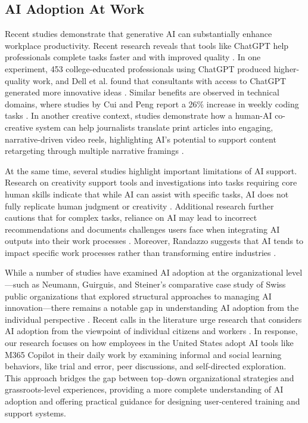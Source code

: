 
\subsection{AI Adoption At Work}
Recent studies demonstrate that generative AI can substantially enhance workplace productivity. Recent research reveals that tools like ChatGPT help professionals complete tasks faster and with improved quality \cite{brynjolfsson2024generativeaiwork}. In one experiment, 453 college-educated professionals using ChatGPT produced higher-quality work, and Dell et al. found that consultants with access to ChatGPT generated more innovative ideas \cite{dell2023navigating}. Similar benefits are observed in technical domains, where studies by Cui and Peng report a 26\% increase in weekly coding tasks \cite{cui2024effects, peng2023impact}. In another creative context, studies demonstrate how a human-AI co-creative system can help journalists translate print articles into engaging, narrative-driven video reels, highlighting AI’s potential to support content retargeting through multiple narrative framings \cite{wang2024reelframer, schmid2021narrative,opal,kantosalo2016modes}.

At the same time, several studies highlight important limitations of AI support. Research on creativity support tools and investigations into tasks requiring core human skills indicate that while AI can assist with specific tasks, AI does not fully replicate human judgment or creativity \cite{tao2023ai, long2024novelty}. Additional research further cautions that for complex tasks, reliance on AI may lead to incorrect recommendations and documents challenges users face when integrating AI outputs into their work processes \cite{dell2023navigating, kim2024unlocking}. Moreover, Randazzo suggests that AI tends to impact specific work processes rather than transforming entire industries \cite{randazzo2024cyborgs}.

While a number of studies have examined AI adoption at the organizational level—such as Neumann, Guirguis, and Steiner’s comparative case study of Swiss public organizations that explored structural approaches to managing AI innovation—there remains a notable gap in understanding AI adoption from the individual perspective \cite{Neumann}. Recent calls in the literature urge research that considers AI adoption from the viewpoint of individual citizens and workers \cite{pencheva,Wirtz03102021}. In response, our research focuses on how employees in the United States adopt AI tools like M365 Copilot in their daily work by examining informal and social learning behaviors, like trial and error, peer discussions, and self-directed exploration. This approach bridges the gap between top–down organizational strategies and grassroots-level experiences, providing a more complete understanding of AI adoption and offering practical guidance for designing user-centered training and support systems.

